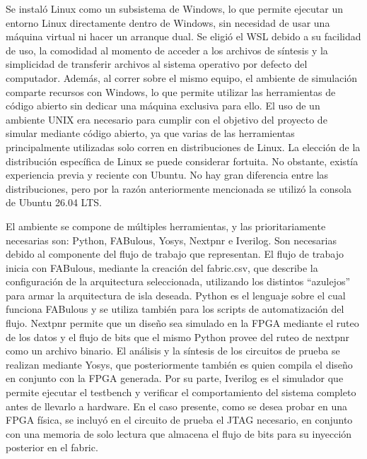 Se instaló Linux como un subsistema de Windows, lo que permite ejecutar un entorno Linux directamente dentro de Windows, sin necesidad de usar una máquina virtual ni hacer un arranque dual. Se eligió el WSL debido a su facilidad de uso, la comodidad al momento de acceder a los archivos de síntesis y la simplicidad de transferir archivos al sistema operativo por defecto del computador. Además, al correr sobre el mismo equipo, el ambiente de simulación comparte recursos con Windows, lo que permite utilizar las herramientas de código abierto sin dedicar una máquina exclusiva para ello. El uso de un ambiente UNIX era necesario para cumplir con el objetivo del proyecto de simular mediante código abierto, ya que varias de las herramientas principalmente utilizadas solo corren en distribuciones de Linux. La elección de la distribución específica de Linux se puede considerar fortuita. No obstante, existía experiencia previa y reciente con Ubuntu. No hay gran diferencia entre las distribuciones, pero por la razón anteriormente mencionada se utilizó la consola de Ubuntu 26.04 LTS.

El ambiente se compone de múltiples herramientas, y las prioritariamente necesarias son: Python, FABulous, Yosys, Nextpnr e Iverilog. Son necesarias debido al componente del flujo de trabajo que representan. El flujo de trabajo inicia con FABulous, mediante la creación del fabric.csv, que describe la configuración de la arquitectura seleccionada, utilizando los distintos “azulejos” para armar la arquitectura de isla deseada. Python es el lenguaje sobre el cual funciona FABulous y se utiliza también para los scripts de automatización del flujo. Nextpnr permite que un diseño sea simulado en la FPGA mediante el ruteo de los datos y el flujo de bits que el mismo Python provee del ruteo de nextpnr como un archivo binario. El análisis y la síntesis de los circuitos de prueba se realizan mediante Yosys, que posteriormente también es quien compila el diseño en conjunto con la FPGA generada. Por su parte, Iverilog es el simulador que permite ejecutar el testbench y verificar el comportamiento del sistema completo antes de llevarlo a hardware. En el caso presente, como se desea probar en una FPGA física, se incluyó en el circuito de prueba el JTAG necesario, en conjunto con una memoria de solo lectura que almacena el flujo de bits para su inyección posterior en el fabric.

